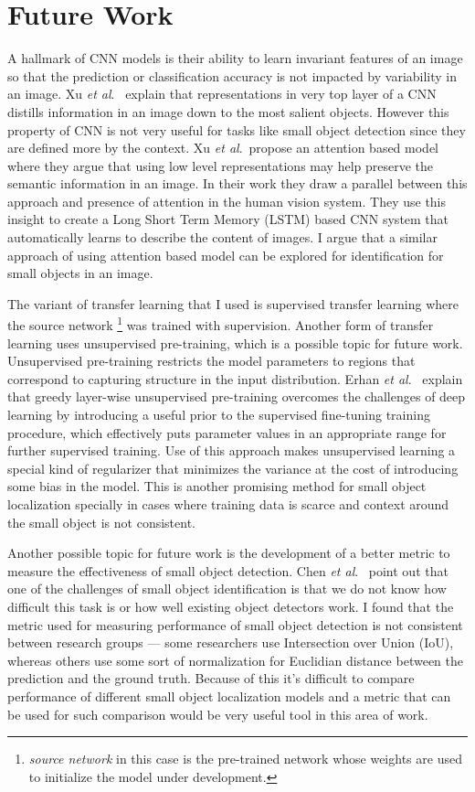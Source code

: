\documentclass [11pt,letterpaper ,openany ]{report}
\begin{document}
    \section{Future Work}
    A hallmark of CNN models is their ability to learn invariant features of an image so that the prediction or classification accuracy is not impacted by variability in an image. Xu \textit {et al}.\ \cite{xu2015show} explain that representations in very top layer of a CNN distills information in an image down to the most salient objects. However this property of CNN is not very useful for tasks like small object detection since they are defined more by the context. Xu \textit {et al}.\ propose an attention based model \cite{xu2015show} where they argue that using low level representations may help preserve the semantic information in an image. In their work they draw a parallel between this approach and presence of attention in the human vision system. They use this insight to create a Long Short Term Memory (LSTM) based CNN system that automatically learns to describe the content of images. I argue that a similar approach of using attention based model can be explored for identification for small objects in an image.

    The variant of transfer learning that I used is supervised transfer learning where the source network \footnote{\textit{source network} in this case is the pre-trained network whose weights are used to initialize the model under development.} was trained with supervision. Another form of transfer learning uses unsupervised pre-training, which is a possible topic for future work. Unsupervised pre-training restricts the model parameters to regions that correspond to capturing structure in the input distribution. Erhan \textit {et al}.\ \cite{erhan2010does} explain that greedy layer-wise unsupervised pre-training overcomes the challenges of deep learning by introducing a useful prior to the supervised fine-tuning training procedure, which effectively puts parameter values in an appropriate range for further supervised training. Use of this approach makes unsupervised learning a special kind of regularizer that minimizes the variance at the cost of introducing some bias in the model. This is another promising method for small object localization specially in cases where training data is scarce and context around the small object is not consistent.

    Another possible topic for future work is the development of a better metric to measure the effectiveness of small object detection. Chen \textit {et al}.\ \cite{chen2016r} point out that one of the challenges of small object identification is that we do not know how difficult this task is or how well existing object detectors work. I found that the metric used for measuring performance of small object detection is not consistent between research groups --- some researchers use Intersection over Union (IoU), whereas others use some sort of normalization for Euclidian distance between the prediction and the ground truth. Because of this it's difficult to compare performance of different small object localization models and a metric that can be used for such comparison would be very useful tool in this area of work.

    \printbibliography[heading=bibintoc,title={References}]
\end{document}
